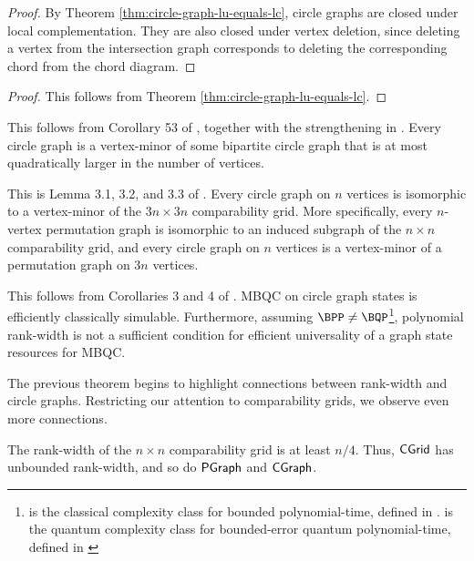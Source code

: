 \begin{proof}
By Theorem \ref{thm:circle-graph-lu-equals-lc}, circle graphs are closed under
local complementation. They are also closed under vertex deletion, since deleting
a vertex from the intersection graph corresponds to deleting the corresponding
chord from the chord diagram.
\end{proof}

\begin{proof}
This follows from Theorem \ref{thm:circle-graph-lu-equals-lc}.
\end{proof}

\begin{theorem}
\label{thm:cgraph-vertex-minor-bipartite-cgraph}
This follows from Corollary 53 of \cite{brijder2016isotropicmatroidsiicircle}, together with the strengthening in \cite{circle-graphs}. Every circle graph is a vertex-minor of some bipartite circle graph that is at most quadratically larger in the number of vertices.
\end{theorem}

\begin{theorem}
\label{thm:cgraph-vertex-minor-cgrid}
This is Lemma 3.1, 3.2, and 3.3 of \cite{grid-theorem}. Every circle graph on $n$ vertices is isomorphic to a vertex-minor of the $3n \times 3n$ comparability grid. More specifically, every $n$-vertex permutation graph is isomorphic to an induced subgraph of the $n \times n$ comparability grid, and every circle graph on $n$ vertices is a vertex-minor of a permutation graph on $3n$ vertices.
\end{theorem}

\begin{theorem}
\label{thm:cgrid-efficiently-simulable}
This follows from Corollaries 3 and 4 of \cite{circle-graphs}. MBQC on circle graph states is efficiently classically simulable. Furthermore, assuming $\BPP \neq \BQP$\footnote{\term{$\BPP$} is the classical complexity class for bounded polynomial-time, defined in \cite{bpp-def}. \term{$\BQP$} is the quantum complexity class for bounded-error quantum polynomial-time, defined in \cite{bqp-def}}, polynomial rank-width is not a sufficient condition for efficient universality of a graph state resources for MBQC.
\end{theorem}

The previous theorem begins to highlight connections between rank-width and circle graphs. Restricting our attention to comparability grids, we observe even more connections.

\begin{theorem}
\label{thm:cgrid-unbounded-rank-width}
The rank-width of the $n \times n$ comparability grid is at least $n/4$. Thus, $\mathsf{CGrid}$ has unbounded rank-width, and so do $\mathsf{PGraph}$ and $\mathsf{CGraph}$.
\end{theorem}

